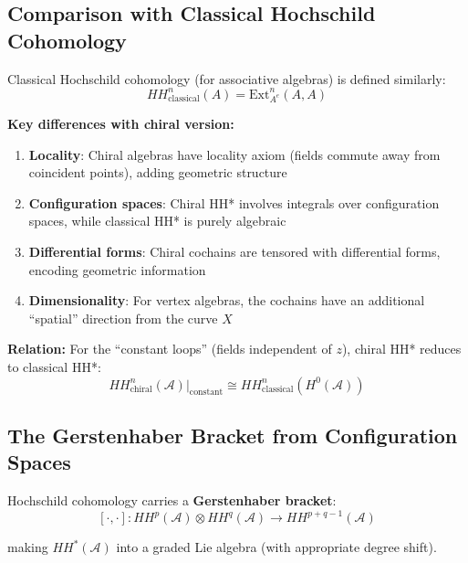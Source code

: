 \subsection{Comparison with Classical Hochschild Cohomology}

\begin{remark}\label{rem:chiral-vs-classical-hochschild}
Classical Hochschild cohomology (for associative algebras) is defined similarly:
$$HH^n_{\text{classical}}(A) = \text{Ext}^n_{A^e}(A, A)$$

\textbf{Key differences with chiral version:}

\begin{enumerate}
\item \textbf{Locality}: Chiral algebras have locality axiom (fields commute away from
coincident points), adding geometric structure

\item \textbf{Configuration spaces}: Chiral HH* involves integrals over configuration spaces,
while classical HH* is purely algebraic

\item \textbf{Differential forms}: Chiral cochains are tensored with differential forms,
encoding geometric information

\item \textbf{Dimensionality}: For vertex algebras, the cochains have an additional ``spatial''
direction from the curve $X$
\end{enumerate}

\textbf{Relation:} For the ``constant loops'' (fields independent of $z$), chiral HH* reduces
to classical HH*:
$$HH^n_{\text{chiral}}(\mathcal{A})|_{\text{constant}} \cong HH^n_{\text{classical}}(H^0(\mathcal{A}))$$
\end{remark}

\subsection{The Gerstenhaber Bracket from Configuration Spaces}

\begin{theorem}\label{thm:gerstenhaber-structure}
Hochschild cohomology carries a \textbf{Gerstenhaber bracket}:
$$[\cdot, \cdot]: HH^p(\mathcal{A}) \otimes HH^q(\mathcal{A}) \to HH^{p+q-1}(\mathcal{A})$$

making $HH^*(\mathcal{A})$ into a graded Lie algebra (with appropriate degree shift).
\end{theorem}

